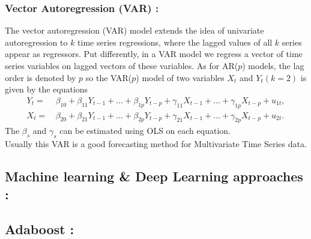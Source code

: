 \subsubsection{Vector Autoregression (VAR) : }
The vector autoregression (VAR) model extends the idea of univariate autoregression to $k$ time series regressions, where the lagged values of all $k$ series appear as regressors. Put differently, in a VAR model we regress a vector of time series variables on lagged vectors of these variables. As for AR($p$) models, the lag order is denoted by $p$ so the VAR($p$) model of two variables $X_{t}$ and $Y_{t}(k=2)$ is given by the equations  
\begin{align*}
  Y_t =& \, \beta_{10} + \beta_{11} Y_{t-1} + \dots + \beta_{1p} Y_{t-p} + \gamma_{11} X_{t-1} + \dots + \gamma_{1p} X_{t-p} + u_{1t}, \\
  X_t =& \, \beta_{20} + \beta_{21} Y_{t-1} + \dots + \beta_{2p} Y_{t-p} + \gamma_{21} X_{t-1} + \dots + \gamma_{2p} X_{t-p} + u_{2t}.
\end{align*}
The $\beta_{s}$ and  $\gamma_{s}$ can be estimated using OLS on each equation.\\Usually this VAR is a good forecasting method for Multivariate Time Series data.

\subsection{Machine learning \& Deep Learning approaches :}


\subsection{Adaboost :}


